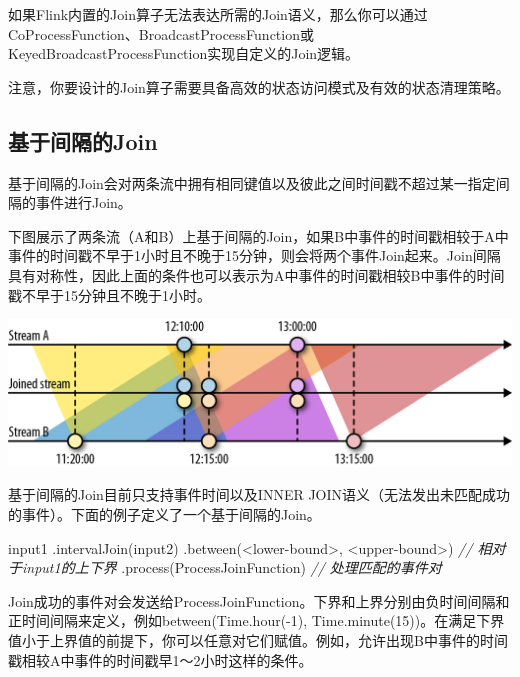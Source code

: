 \documentclass[cn,11pt,chinese]{elegantbook}
\newenvironment{Shaded}{}{}
\newcommand{\CommentTok}[1]{\textcolor[rgb]{0.38,0.63,0.69}{\textit{#1}}}
\newcommand{\FunctionTok}[1]{\textcolor[rgb]{0.02,0.16,0.49}{#1}}
\newcommand{\NormalTok}[1]{#1}
\renewenvironment{quote}{\begin{customblockquote}\list{}{\rightmargin=0em\leftmargin=0em}%
\item\relax\color{blockquote-text}\ignorespaces}{\unskip\unskip\endlist\end{customblockquote}}
\begin{document}
如果Flink内置的Join算子无法表达所需的Join语义，那么你可以通过CoProcessFunction、BroadcastProcessFunction或KeyedBroadcastProcessFunction实现自定义的Join逻辑。

\begin{quote}
注意，你要设计的Join算子需要具备高效的状态访问模式及有效的状态清理策略。
\end{quote}

\hypertarget{ux57faux4e8eux95f4ux9694ux7684join}{%
\subsection{基于间隔的Join}\label{ux57faux4e8eux95f4ux9694ux7684join}}

基于间隔的Join会对两条流中拥有相同键值以及彼此之间时间戳不超过某一指定间隔的事件进行Join。

下图展示了两条流（A和B）上基于间隔的Join，如果B中事件的时间戳相较于A中事件的时间戳不早于1小时且不晚于15分钟，则会将两个事件Join起来。Join间隔具有对称性，因此上面的条件也可以表示为A中事件的时间戳相较B中事件的时间戳不早于15分钟且不晚于1小时。

\includegraphics{images/spaf_0607.png}

基于间隔的Join目前只支持事件时间以及INNER
JOIN语义（无法发出未匹配成功的事件）。下面的例子定义了一个基于间隔的Join。

\begin{Shaded}
\begin{Highlighting}[]
\NormalTok{input1}
\NormalTok{  .}\FunctionTok{intervalJoin}\NormalTok{(input2)}
\NormalTok{  .}\FunctionTok{between}\NormalTok{(\textless{}lower{-}bound\textgreater{}, \textless{}upper{-}bound\textgreater{}) }\CommentTok{// 相对于input1的上下界}
\NormalTok{  .}\FunctionTok{process}\NormalTok{(ProcessJoinFunction) }\CommentTok{// 处理匹配的事件对}
\end{Highlighting}
\end{Shaded}

Join成功的事件对会发送给ProcessJoinFunction。下界和上界分别由负时间间隔和正时间间隔来定义，例如between(Time.hour(-1),
Time.minute(15))。在满足下界值小于上界值的前提下，你可以任意对它们赋值。例如，允许出现B中事件的时间戳相较A中事件的时间戳早1～2小时这样的条件。
\end{document}
